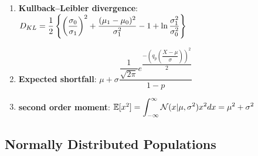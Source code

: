 \begin{enumerate}
    \item
    \textbf{Kullback–Leibler divergence}:
    ${\displaystyle D_{KL} = {1 \over 2}\left\{\left({\dfrac {\sigma _{0}}{\sigma _{1}}}\right)^{2}+{\dfrac {(\mu _{1}-\mu _{0})^{2}}{\sigma _{1}^{2}}}-1+\ln {\sigma _{1}^{2} \over \sigma _{0}^{2}}\right\}}$
    \hfill\cite{wiki/Normal_distribution}

    \item
    \textbf{Expected shortfall}:
    ${\displaystyle \mu +\sigma {\dfrac {{\dfrac {1}{\sqrt {2\pi }}}e^{\dfrac {-\left(q_{p}\left({\dfrac {X-\mu }{\sigma }}\right)\right)^{2}}{2}}}{1-p}}}$
    \hfill\cite{wiki/Normal_distribution}

    \item
    \textbf{second order moment}:
    $
        \mathbb{E}[x^2]
        = \displaystyle\int_{-\infty}^\infty \mathcal{N}(x|\mu, \sigma^2) x^2 dx
        = \mu^2 + \sigma^2
    $
    \hfill \cite{ml/book/Pattern-Recognition-And-Machine-Learning/Christopher-M-Bishop}

\end{enumerate}









\subsection{Normally Distributed Populations}


